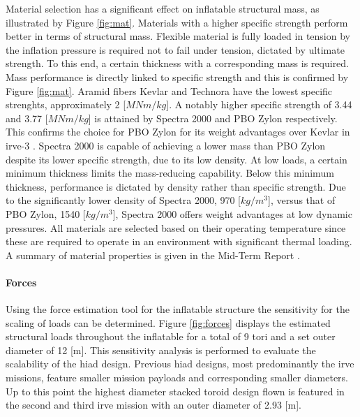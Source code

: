 Material selection has a significant effect on inflatable structural mass, as illustrated by Figure \ref{fig:mat}. Materials with a higher specific strength perform better in terms of structural mass. Flexible material is fully loaded in tension by the inflation pressure is required not to fail under tension, dictated by ultimate strength. To this end, a certain thickness with a corresponding mass is required. Mass performance is directly linked to specific strength and this is confirmed by Figure \ref{fig:mat}. Aramid fibers Kevlar and Technora have the lowest specific strenghts, approximately 2 [$MNm/kg$]. A notably higher specific strength of 3.44 and 3.77 [$MNm/kg$] is attained by Spectra 2000 and PBO Zylon respectively. This confirms the choice for PBO Zylon for its weight advantages over Kevlar in \gls{irve}-3 \cite{Dillman2012a}. Spectra 2000 is capable of achieving a lower mass than PBO Zylon despite its lower specific strength, due to its low density. At low loads, a certain minimum thickness limits the mass-reducing capability. Below this minimum thickness, performance is dictated by density rather than specific strength. Due to the significantly lower density of Spectra 2000, 970 [$kg/m^{3}$], versus that of PBO Zylon, 1540 [$kg/m^{3}$], Spectra 2000 offers weight advantages at low dynamic pressures. All materials are selected based on their operating temperature since these are required to operate in an environment with significant thermal loading. A summary of material properties is given in the Mid-Term Report \cite[p.64]{Balasooriyan2015b}.


\paragraph{Forces}

Using the force estimation tool for the inflatable structure the sensitivity for the scaling of loads can be determined. Figure \ref{fig:forces} displays the estimated structural loads throughout the inflatable for a total of 9 tori and a set outer diameter of 12 [m]. This sensitivity analysis is performed to evaluate the scalability of the \gls{hiad} design. Previous \gls{hiad} designs, most predominantly the \gls{irve} missions, feature smaller mission payloads and corresponding smaller diameters. Up to this point the highest diameter stacked toroid design flown is featured in the second and third \gls{irve} mission with an outer diameter of 2.93 [m]. 

